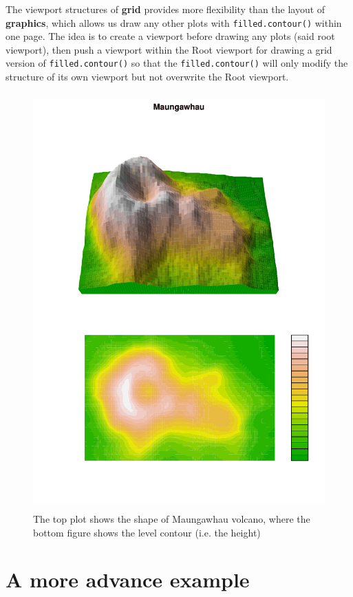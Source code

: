\documentclass[paper=a4, fontsize=11pt]{report}
\begin{document}
The viewport structures of \textbf{grid} provides more flexibility than the layout of \textbf{graphics}, which allows us draw any other plots with \texttt{filled.contour()} within one page. The idea is to create a viewport before drawing any plots (said root viewport), then push a viewport within the Root viewport for drawing a grid version of \texttt{filled.contour()} so that the \texttt{filled.contour()} will only modify the structure of its own viewport but not overwrite the Root viewport.\\
\begin{figure}[H]
	\begin{center}
		\includegraphics[height = 16cm, width = 12cm]{figure/Chapter6_example_3_1.pdf}
		\caption{The top plot shows the shape of Maungawhau volcano, where the bottom figure shows the level contour (i.e. the height)}
		\label{Example_6.2.1}
	\end{center}
\end{figure}

\section{A more advance example}
\end{document}
